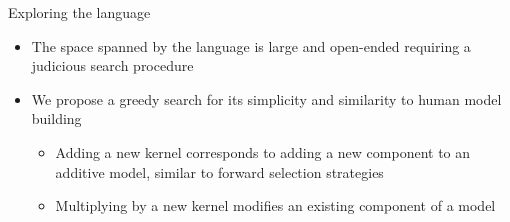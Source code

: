 \begin{frame}{Exploring the language}
  \begin{itemize}
    \item The space spanned by the language is large and open-ended requiring a judicious search procedure
    \vspace{\baselineskip}
    \item We propose a greedy search for its simplicity and similarity to human model building
    \begin{itemize}
      \item Adding a new kernel corresponds to adding a new component to an additive model, similar to forward selection strategies
      \item Multiplying by a new kernel modifies an existing component of a model
    \end{itemize}
  \end{itemize}
\end{frame}

